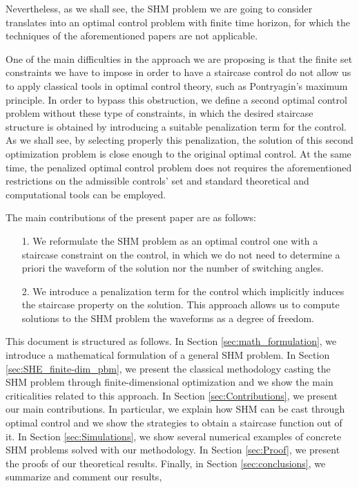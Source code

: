 \documentclass[twocolumn]{autart}    %
\begin{document}
Nevertheless, as we shall see, the SHM problem we are going to consider translates into an optimal control problem with finite time horizon, for which the techniques of the aforementioned papers are not applicable. 

One of the main difficulties in the approach we are proposing is that the finite set constraints we have to impose in order to have a staircase control do not allow us to apply classical tools in optimal control theory, such as Pontryagin's maximum principle. In order to bypass this obstruction, we define a second optimal control problem without these type of constraints, in which the desired staircase structure is obtained by introducing a suitable penalization term for the control. As we shall see, by selecting properly this penalization, the solution of this second optimization problem is close enough to the original optimal control. At the same time, the penalized optimal control problem does not requires the aforementioned restrictions on the admissible controls' set and standard theoretical and computational tools can be employed. 

The main contributions of the present paper are as follows:
\begin{enumerate}
    \item[1.] We reformulate the SHM problem as an optimal control one with a staircase constraint on the control, in which we do not need to determine a priori the waveform of the solution nor the number of switching angles.  
    \item[2.] We introduce a penalization term for the control which implicitly induces the staircase property on the solution. 
	This approach allows us to compute solutions to the SHM problem the waveforms as a degree of freedom.
\end{enumerate}

This document is structured as follows. In Section \ref{sec:math_formulation}, we introduce a mathematical formulation of a general SHM problem. 
In Section \ref{sec:SHE_finite-dim_pbm}, we present the classical methodology casting the SHM problem through finite-dimensional optimization and we show the main criticalities related to this approach. In Section \ref{sec:Contributions}, we present our main contributions. In particular, we explain how SHM can be cast through optimal control and we show the strategies to obtain a staircase function out of it. In Section \ref{sec:Simulations}, we show several numerical examples of concrete SHM problems solved with our methodology. In Section \ref{sec:Proof}, we present the proofs of our theoretical results. Finally, in Section \ref{sec:conclusions}, we summarize and comment our results,  
\end{document}
